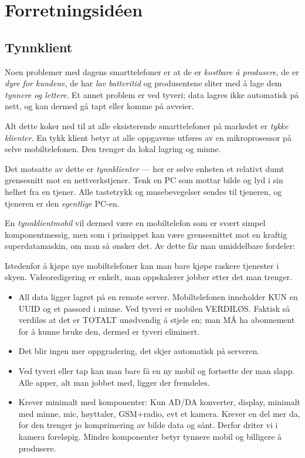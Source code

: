 \chapter{Forretningsidéen}

\section{Tynnklient}
Noen problemer med dagens smarttelefoner er at de er \textit{kostbare å
produsere}, de er \textit{dyre for kundene}, de har \textit{lav batteritid}
og produsentene sliter med å lage dem \textit{tynnere og lettere}. Et annet
problem er ved tyveri; data lagres ikke automatisk på nett, og kan dermed gå
tapt eller komme på avveier.

Alt dette koker ned til at alle eksisterende smarttelefoner på markedet er \textit{tykke
klienter}. En tykk klient betyr at alle oppgavene utføres av en mikroprosessor
på selve mobiltelefonen. Den trenger da lokal lagring og minne. 

Det motsatte av dette er \textit{tynnklienter} --- her er selve enheten et
relativt dumt grensesnitt mot en nettverkstjener. Tenk en PC som mottar bilde
og lyd i sin helhet fra en tjener. Alle tastetrykk og musebevegelser sendes til
tjeneren, og tjeneren er den \textit{egentlige} PC-en.

En \textit{tynnklientmobil} vil dermed være en mobiltelefon som er svært simpel
komponentmessig, men som i prinsippet kan være grensesnittet mot en kraftig
superdatamaskin, om man så ønsker det. Av dette får man umiddelbare fordeler:

Istedenfor å kjøpe nye mobiltelefoner kan man bare kjøpe raskere tjenester i
skyen. Videoredigering er enkelt, man oppskalerer jobber etter det man trenger.

\begin{itemize}
  \item All data ligger lagret på en remote server. Mobiltelefonen inneholder
  KUN en UUID og et passord i minne. Ved tyveri er mobilen VERDILØS. Faktisk så
  verdiløs at det er TOTALT unødvendig å stjele en; man MÅ ha abonnement for å
  kunne bruke den, dermed er tyveri eliminert.

  \item Det blir ingen mer oppgradering, det skjer automatisk på serveren.

  \item Ved tyveri eller tap kan man bare få en ny mobil og fortsette der
  man slapp. Alle apper, alt man jobbet med, ligger der fremdeles.

  \item Krever minimalt med komponenter: Kun AD/DA konverter, display,
  minimalt med minne, mic, høyttaler, GSM+radio, evt et kamera. Krever en del
  mer da, for den trenger jo komprimering av bilde data og sånt. Derfor driter
  vi i kamera foreløpig. Mindre komponenter betyr tynnere mobil og billigere å
  produsere.

\end{itemize}

